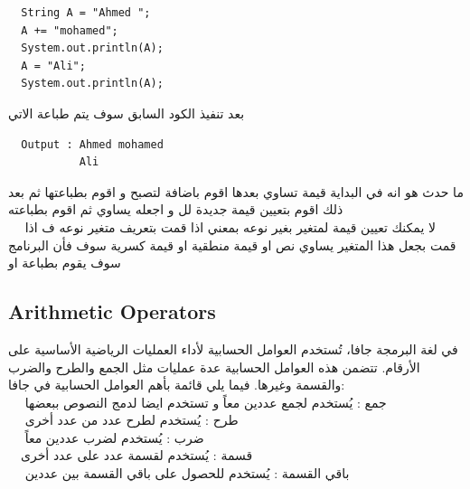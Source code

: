 \begin{verbatim}
  String A = "Ahmed ";
  A += "mohamed";
  System.out.println(A);
  A = "Ali";
  System.out.println(A);
\end{verbatim}
\begin{AR}  
  بعد تنفيذ الكود السابق سوف يتم طباعة الاتي
\end{AR}
\begin{verbatim}
  Output : Ahmed mohamed
           Ali
\end{verbatim}
\begin{AR} 
  ما حدث هو انه في البداية قيمة  تساوي  بعدها اقوم باضافة  لتصبح  و اقوم بطباعتها ثم بعد ذلك اقوم بتعيين قيمة جديدة لل  و اجعله يساوي  ثم اقوم بطباعته
  \\
\ \ \LR{\textcolor{theme}{- 4}} لا يمكنك تعيين قيمة لمتغير بغير نوعه بمعني اذا قمت بتعريف متغير نوعه  ف اذا قمت بجعل هذا المتغير يساوي نص او قيمة منطقية او قيمة كسرية سوف فأن البرنامج سوف يقوم بطباعة  او 
\end{AR}
\newpage
\subsection{Arithmetic Operators}
\begin{AR}
في لغة البرمجة جافا، تُستخدم العوامل الحسابية  لأداء العمليات الرياضية الأساسية على الأرقام. تتضمن هذه العوامل الحسابية عدة عمليات مثل الجمع والطرح والضرب والقسمة وغيرها. فيما يلي قائمة بأهم العوامل الحسابية في جافا:
\\
\ \ \LR{\textcolor{theme}{- 1}} جمع \LR{(+)}: يُستخدم لجمع عددين معاً و تستخدم ايضا لدمج النصوص ببعضها
\\
\ \ \LR{\textcolor{theme}{- 2}} طرح \LR{(-)}: يُستخدم لطرح عدد من عدد أخرى
\\
\ \ \LR{\textcolor{theme}{- 3}} ضرب \LR{(*)}: يُستخدم لضرب عددين معاً
\\
\ \ \LR{\textcolor{theme}{- 4}}قسمة \LR{(/)}: يُستخدم لقسمة عدد على عدد أخرى
\\
\ \ \LR{\textcolor{theme}{- 5}} باقي القسمة \LR{(\%)}: يُستخدم للحصول على باقي القسمة بين عددين
\end{AR}

